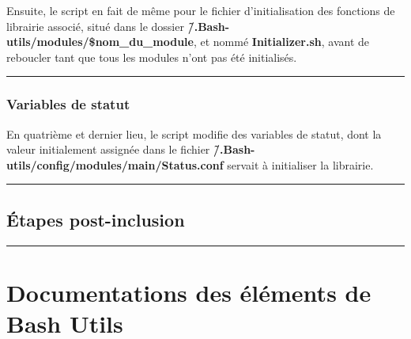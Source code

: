 \documentclass[a4paper,10pt]{article}
\begin{document}
    \begin{justify}
        Ensuite, le script en fait de même pour le fichier d'initialisation des fonctions de librairie associé, situé dans le dossier \textbf{\color{path}\~/.Bash-utils/modules/\$nom\_du\_module}, et nommé \textbf{\color{path}Initializer.sh}, avant de reboucler tant que tous les modules n'ont pas été initialisés.
    \end{justify}


    \color{sec3}\par\noindent\rule{\textwidth}{0.4pt}\color{text}

    \color{sec3}
    \subsubsection{Variables de statut}\color{text}

    \begin{justify}
        En quatrième et dernier lieu, le script modifie des variables de statut, dont la valeur initialement assignée dans le fichier \textbf{\color{path}\~/.Bash-utils/config/modules/main/Status.conf} servait à initialiser la librairie.
    \end{justify}




    \color{sec2}\par\noindent\rule{\textwidth}{0.4pt}\color{text}

    \color{sec2}
    \subsection{Étapes post-inclusion}\color{text}





    \color{sec1}\par\noindent\rule{\textwidth}{0.4pt}\color{text}

    \color{sec1}
    \section{Documentations des éléments de Bash Utils}\color{text}
\end{document}
